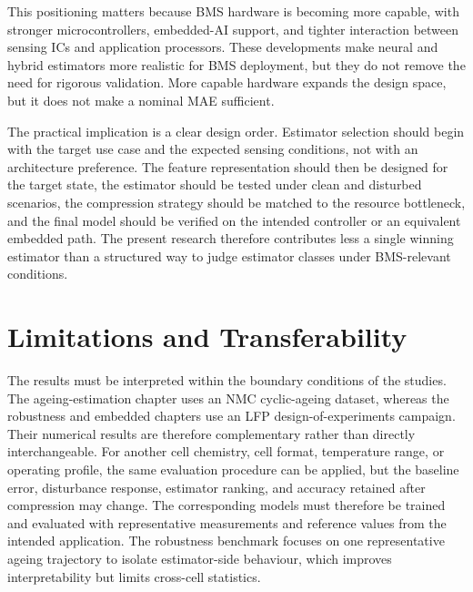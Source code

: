 \documentclass[
    a4paper,
    12pt,
    titlepage,
    bibliography=totoc,
    twoside=on,
    parskip=false,
    numbers=noenddot,
    cleardoublepage=empty,
    DIV=12,
    BCOR=12.0mm,
    headheight=36pt,
    headings=openright
]{scrreprt}
\begin{document}
This positioning matters because BMS hardware is becoming more capable, with stronger microcontrollers, embedded-AI support, and tighter interaction between sensing ICs and application processors. These developments make neural and hybrid estimators more realistic for BMS deployment, but they do not remove the need for rigorous validation. More capable hardware expands the design space, but it does not make a nominal MAE sufficient.

The practical implication is a clear design order. Estimator selection should begin with the target use case and the expected sensing conditions, not with an architecture preference. The feature representation should then be designed for the target state, the estimator should be tested under clean and disturbed scenarios, the compression strategy should be matched to the resource bottleneck, and the final model should be verified on the intended controller or an equivalent embedded path. The present research therefore contributes less a single winning estimator than a structured way to judge estimator classes under BMS-relevant conditions.

\section{Limitations and Transferability}
\label{sec:overall_limitations}
The results must be interpreted within the boundary conditions of the studies. The ageing-estimation chapter uses an NMC cyclic-ageing dataset, whereas the robustness and embedded chapters use an LFP design-of-experiments campaign. Their numerical results are therefore complementary rather than directly interchangeable. For another cell chemistry, cell format, temperature range, or operating profile, the same evaluation procedure can be applied, but the baseline error, disturbance response, estimator ranking, and accuracy retained after compression may change. The corresponding models must therefore be trained and evaluated with representative measurements and reference values from the intended application. The robustness benchmark focuses on one representative ageing trajectory to isolate estimator-side behaviour, which improves interpretability but limits cross-cell statistics.
\end{document}
